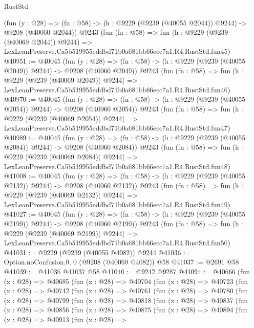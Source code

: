 \begin{lexlean}{RustStd}
\begin{coremodule}
    (fun (y : @28) =>
    (fn : @58) -> (h : @9229 (@9239 (@40055 @2044)) @9244) -> @9208 (@40060 @2044))
    @9243
    (fun (fn : @58) =>
    fun (h : @9229 (@9239 (@40069 @2044)) @9244) =>
    LexLeanPreserve.Ca5b519955eddbd71b0a681bb66ecc7a1.R4.RustStd.fun45)
@40951 := @40045
    (fun (y : @28) =>
    (fn : @58) -> (h : @9229 (@9239 (@40055 @2049)) @9244) -> @9208 (@40060 @2049))
    @9243
    (fun (fn : @58) =>
    fun (h : @9229 (@9239 (@40069 @2049)) @9244) =>
    LexLeanPreserve.Ca5b519955eddbd71b0a681bb66ecc7a1.R4.RustStd.fun46)
@40970 := @40045
    (fun (y : @28) =>
    (fn : @58) -> (h : @9229 (@9239 (@40055 @2054)) @9244) -> @9208 (@40060 @2054))
    @9243
    (fun (fn : @58) =>
    fun (h : @9229 (@9239 (@40069 @2054)) @9244) =>
    LexLeanPreserve.Ca5b519955eddbd71b0a681bb66ecc7a1.R4.RustStd.fun47)
@40989 := @40045
    (fun (y : @28) =>
    (fn : @58) -> (h : @9229 (@9239 (@40055 @2084)) @9244) -> @9208 (@40060 @2084))
    @9243
    (fun (fn : @58) =>
    fun (h : @9229 (@9239 (@40069 @2084)) @9244) =>
    LexLeanPreserve.Ca5b519955eddbd71b0a681bb66ecc7a1.R4.RustStd.fun48)
@41008 := @40045
    (fun (y : @28) =>
    (fn : @58) -> (h : @9229 (@9239 (@40055 @2132)) @9244) -> @9208 (@40060 @2132))
    @9243
    (fun (fn : @58) =>
    fun (h : @9229 (@9239 (@40069 @2132)) @9244) =>
    LexLeanPreserve.Ca5b519955eddbd71b0a681bb66ecc7a1.R4.RustStd.fun49)
@41027 := @40045
    (fun (y : @28) =>
    (fn : @58) -> (h : @9229 (@9239 (@40055 @2199)) @9244) -> @9208 (@40060 @2199))
    @9243
    (fun (fn : @58) =>
    fun (h : @9229 (@9239 (@40069 @2199)) @9244) =>
    LexLeanPreserve.Ca5b519955eddbd71b0a681bb66ecc7a1.R4.RustStd.fun50)
@41031 := @9229 (@9239 (@40055 @4082)) @9244
@41036 := Option.noConfusion.{0, 0} (@9208 (@40060 @4082)) @58
@41037 := @2691 @58
@41039 := @41036 @41037 @58
@41040 := @9242 @9287
@41094 := @40666
    (fun (x : @28) =>
    @40685
      (fun (x : @28) =>
      @40704
        (fun (x : @28) =>
        @40723
          (fun (x : @28) =>
          @40742
            (fun (x : @28) =>
            @40761
              (fun (x : @28) =>
              @40780
                (fun (x : @28) =>
                @40799
                  (fun (x : @28) =>
                  @40818
                    (fun (x : @28) =>
                    @40837
                      (fun (x : @28) =>
                      @40856
                        (fun (x : @28) =>
                        @40875
                          (fun (x : @28) =>
                          @40894
                            (fun (x : @28) =>
                            @40913
                              (fun (x : @28) =>

\end{coremodule}
\end{lexlean}
